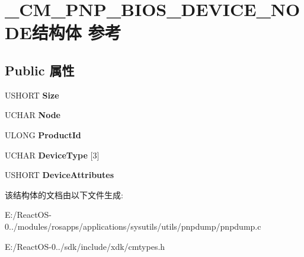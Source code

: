 \hypertarget{struct___c_m___p_n_p___b_i_o_s___d_e_v_i_c_e___n_o_d_e}{}\section{\+\_\+\+C\+M\+\_\+\+P\+N\+P\+\_\+\+B\+I\+O\+S\+\_\+\+D\+E\+V\+I\+C\+E\+\_\+\+N\+O\+D\+E结构体 参考}
\label{struct___c_m___p_n_p___b_i_o_s___d_e_v_i_c_e___n_o_d_e}
\subsection*{Public 属性}
\begin{DoxyCompactItemize}
\item 
\mbox{\label{struct___c_m___p_n_p___b_i_o_s___d_e_v_i_c_e___n_o_d_e_a55c80a8c3054cb79ae14098937d26edb}} 
U\+S\+H\+O\+RT {\bfseries Size}
\item 
\mbox{\label{struct___c_m___p_n_p___b_i_o_s___d_e_v_i_c_e___n_o_d_e_a8744f03134dc2bae0827f745b0c9ecc4}} 
U\+C\+H\+AR {\bfseries Node}
\item 
\mbox{\label{struct___c_m___p_n_p___b_i_o_s___d_e_v_i_c_e___n_o_d_e_a0782fc1e11343a229877b4e1ad0f3887}} 
U\+L\+O\+NG {\bfseries Product\+Id}
\item 
\mbox{\label{struct___c_m___p_n_p___b_i_o_s___d_e_v_i_c_e___n_o_d_e_afa75221ddc44c800cd6a7933767db63b}} 
U\+C\+H\+AR {\bfseries Device\+Type} \mbox{[}3\mbox{]}
\item 
\mbox{\label{struct___c_m___p_n_p___b_i_o_s___d_e_v_i_c_e___n_o_d_e_af9f871579e7e0961a67748f9cf9d2940}} 
U\+S\+H\+O\+RT {\bfseries Device\+Attributes}
\end{DoxyCompactItemize}


该结构体的文档由以下文件生成\+:\begin{DoxyCompactItemize}
\item 
E\+:/\+React\+O\+S-\/0../modules/rosapps/applications/sysutils/utils/pnpdump/pnpdump.\+c\item 
E\+:/\+React\+O\+S-\/0../sdk/include/xdk/cmtypes.\+h\end{DoxyCompactItemize}
